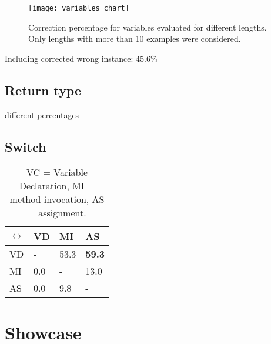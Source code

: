 \begin{figure}[p]
\centering
\texttt{[image: variables\_chart]}
\caption{Correction percentage for variables evaluated for different lengths. Only lengths with more than 10 examples were considered.}
\label{variables_chart}
\end{figure}

Including corrected wrong instance: 45.6\%

\subsection{Return type}

different percentages

\subsection{Switch}

\begin{table}[h]
\begin{tabular}{ | m{1cm} | m{1cm} | m{1cm} | m{1cm} | }
  \hline
  \(\leftrightarrow\) & VD & MI & AS \\
  \hline
  \hline
  VD & - & 53.3 & \textbf{59.3} \\
  \hline
  MI & 0.0 & - & 13.0 \\
  \hline
  AS & 0.0 & 9.8 & - \\
  \hline
\end{tabular}
\caption{VC = Variable Declaration, MI = method invocation, AS = assignment.}
\label{switch_table}
\end{table}

\section{Showcase}

